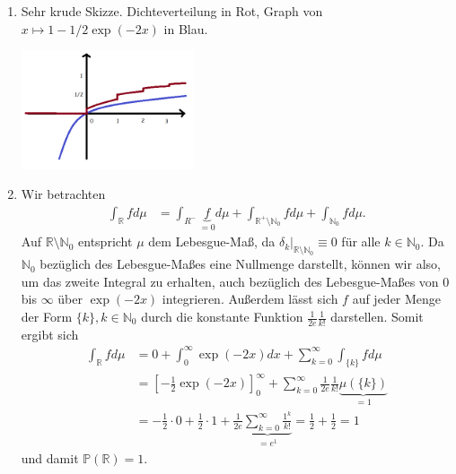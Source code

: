 \documentclass{article}
\def\N{\ensuremath{\mathbb{N}}}
\def\R{\ensuremath{\mathbb{R}}}
\begin{document}
\begin{enumerate}[label=(\alph*)]
	\item Sehr krude Skizze. Dichteverteilung in Rot, Graph von $x \mapsto 1 - 1/2 \exp(-2x)$ in Blau.
	      \begin{center}
		      \includegraphics[width=0.4\textwidth]{skizze.png}
	      \end{center}
	\item Wir betrachten
	      \begin{align*}
		      \int_{\R} f d\mu & = \int_{R^-} \underbrace{f}_{=0} d\mu + \int_{\R^+ \setminus \N_0} f d\mu + \int_{\N_0} f d\mu\text{.}
	      \end{align*}
	      Auf $\R \setminus \N_0$ entspricht $\mu$ dem Lebesgue-Maß, da $\delta_k|_{\R\setminus \N_0} \equiv 0$ für alle $k \in \N_0$. Da $\N_0$ bezüglich des Lebesgue-Maßes eine Nullmenge darstellt, können wir also, um das zweite Integral zu erhalten, auch bezüglich des Lebesgue-Maßes von $0$ bis $\infty$ über $\exp(-2x)$ integrieren. Außerdem lässt sich $f$ auf jeder Menge der Form $\{k\}, k \in \N_0$ durch die konstante Funktion $\frac{1}{2e} \frac{1}{k!}$ darstellen. Somit ergibt sich
	      \begin{align*}
		      \int_{\R} f d\mu & = 0 + \int_{0}^{\infty} \exp(-2x) dx + \sum_{k=0}^{\infty} \int_{\{k\}} f d\mu                                                                       \\
		                       & = \left[-\frac{1}{2} \exp(-2x)\right]_0^\infty + \sum_{k=0}^{\infty} \frac{1}{2e} \frac{1}{k!} \underbrace{\mu(\{k\})}_{=1}                          \\
		                       & = -\frac{1}{2} \cdot 0 + \frac{1}{2} \cdot 1 + \frac{1}{2e} \underbrace{\sum_{k = 0}^{\infty} \frac{1^k}{k!}}_{=e^1} = \frac{1}{2} + \frac{1}{2} = 1
	      \end{align*}
	      und damit $\mathds{P}(\R) = 1$.
\end{enumerate}
\end{document}
